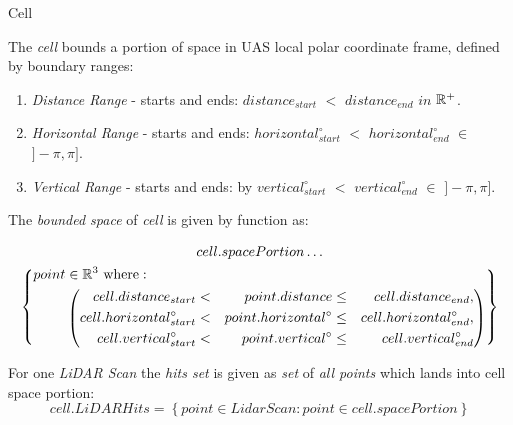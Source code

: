 \begin{definition}{Cell}\label{def:cell}
	
    The \emph{cell} bounds a portion of space in UAS local polar coordinate frame, defined by boundary ranges:
    \begin{enumerate}
        
        \item \emph{Distance Range} -  starts and ends: $distance_{start}$ $<$ $distance_{end}$ $in$ $\mathbb{R}^+$.
        
        \item \emph{Horizontal Range} - starts and ends: $horizontal^\circ_{start}$ $<$ $horizontal^\circ_{end}$ $\in$ $]-\pi,\pi]$.
        
        \item \emph{Vertical Range} - starts and ends: by $vertical^\circ_{start}$ $<$ $vertical^\circ_{end}$ $\in$ $]-\pi,\pi]$.
    \end{enumerate}
    
    \noindent The \emph{bounded space} of \emph{cell} is given by function as:
    
    \begin{multline}\label{eq:boundedSpaceCell}
        cell.space Portion\dots\\
            \left \{
                \begin{aligned}
                point& \in \mathbb{R}^3 \text{ where}:\\
                    &\left(\begin{aligned}
                        cell.distance_{start} &<& point.distance &\le& cell.distance_{end},\\
                        cell.horizontal^\circ_{start} &<& point.horizontal^\circ &\le&  cell.horizontal^\circ_{end},\\
                        cell.vertical^\circ_{start} &<& point.vertical^\circ &\le& cell.vertical^\circ_{end}\\
                    \end{aligned}\right)
                \end{aligned}
            \right\}
    \end{multline}
    
    \noindent For one \emph{LiDAR Scan} the \emph{hits set} is given as \emph{set} of \emph{all points} which lands into cell space portion:
    \begin{equation}\label{eq:LidarHitsCell}
        cell. LiDAR Hits = \left\{point \in Lidar Scan:  point \in cell. space Portion\right\}    
    \end{equation}
    

\end{definition}
